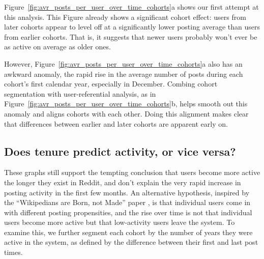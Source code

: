 Figure~\ref{fig:avr_posts_per_user_over_time_cohorts}a shows our first attempt at this analysis.  This Figure already shows a significant cohort effect: users from later cohorts appear to level off at a significantly lower posting average than users from earlier cohorts.  That is, it suggests that newer users probably won't ever be as active on average as older ones.

However, Figure~\ref{fig:avr_posts_per_user_over_time_cohorts}a also has an awkward anomaly, the rapid rise in the average number of posts during each cohort's first calendar year, especially in December.  
Combing cohort segmentation with user-referential analysis, as in Figure~\ref{fig:avr_posts_per_user_over_time_cohorts}b, helps smooth out this anomaly and aligns cohorts with each other.  Doing this alignment makes clear that differences between earlier and later cohorts are apparent early on.



\subsection{Does tenure predict activity, or vice versa?}


These graphs still support the tempting conclusion that users become more active the longer they exist in Reddit, and don't explain the very rapid increase in posting activity in the first few months.  An alternative hypothesis, inspired by the ``Wikipedians are Born, not Made'' paper \cite{}, is that individual users come in with different posting propensities, and the rise over time is not that individual users become more active but that low-activity users leave the system.  To examine this, we further segment each cohort by the number of years they were active in the system, as defined by the difference between their first and last post times.
 
